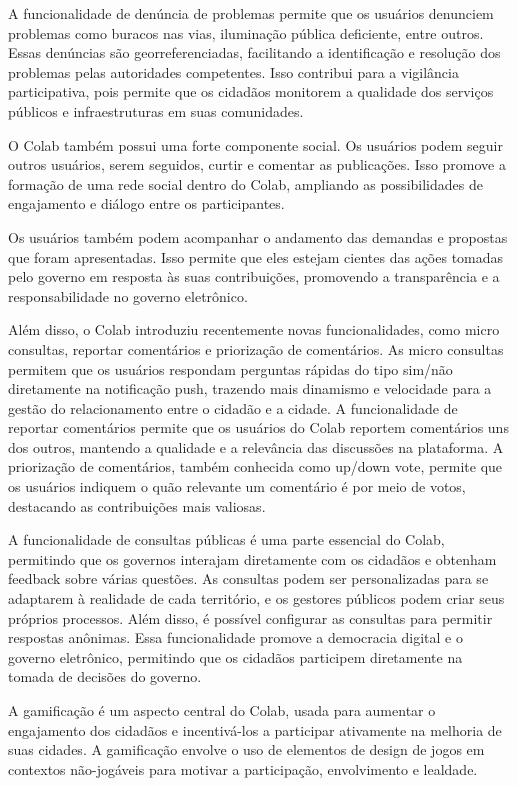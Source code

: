 A funcionalidade de denúncia de problemas permite que os usuários denunciem problemas como buracos nas vias, iluminação pública deficiente, entre outros. Essas denúncias são georreferenciadas, facilitando a identificação e resolução dos problemas pelas autoridades competentes. Isso contribui para a vigilância participativa, pois permite que os cidadãos monitorem a qualidade dos serviços públicos e infraestruturas em suas comunidades.

O Colab também possui uma forte componente social. Os usuários podem seguir outros usuários, serem seguidos, curtir e comentar as publicações. Isso promove a formação de uma rede social dentro do Colab, ampliando as possibilidades de engajamento e diálogo entre os participantes.

Os usuários também podem acompanhar o andamento das demandas e propostas que foram apresentadas. Isso permite que eles estejam cientes das ações tomadas pelo governo em resposta às suas contribuições, promovendo a transparência e a responsabilidade no governo eletrônico.

Além disso, o Colab introduziu recentemente novas funcionalidades, como micro consultas, reportar comentários e priorização de comentários. As micro consultas permitem que os usuários respondam perguntas rápidas do tipo sim/não diretamente na notificação push, trazendo mais dinamismo e velocidade para a gestão do relacionamento entre o cidadão e a cidade. A funcionalidade de reportar comentários permite que os usuários do Colab reportem comentários uns dos outros, mantendo a qualidade e a relevância das discussões na plataforma. A priorização de comentários, também conhecida como up/down vote, permite que os usuários indiquem o quão relevante um comentário é por meio de votos, destacando as contribuições mais valiosas.

A funcionalidade de consultas públicas é uma parte essencial do Colab, permitindo que os governos interajam diretamente com os cidadãos e obtenham feedback sobre várias questões. As consultas podem ser personalizadas para se adaptarem à realidade de cada território, e os gestores públicos podem criar seus próprios processos. Além disso, é possível configurar as consultas para permitir respostas anônimas. Essa funcionalidade promove a democracia digital e o governo eletrônico, permitindo que os cidadãos participem diretamente na tomada de decisões do governo.

A gamificação é um aspecto central do Colab, usada para aumentar o engajamento dos cidadãos e incentivá-los a participar ativamente na melhoria de suas cidades. A gamificação envolve o uso de elementos de design de jogos em contextos não-jogáveis para motivar a participação, envolvimento e lealdade.

